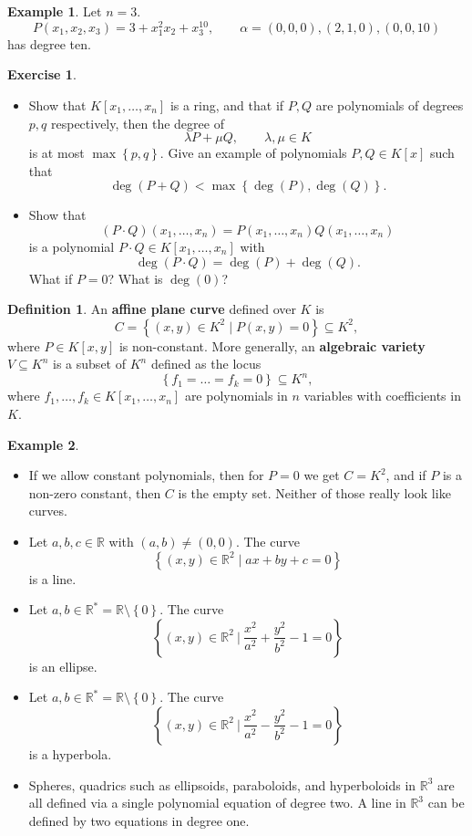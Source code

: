 \documentclass{article}
\newcommand{\R}{\mathbb{R}}
\newcommand{\rb}[1]{\left( #1 \right)}
\renewcommand{\sb}[1]{\left[ #1 \right]}
\newcommand{\cb}[1]{\left\{ #1 \right\}}
\theoremstyle{definition}\newtheorem{definition}{Definition}[section]
\theoremstyle{definition}\newtheorem{notation}[definition]{Notation}
\theoremstyle{definition}\newtheorem{remark}[definition]{Remark}
\theoremstyle{definition}\newtheorem{example1}[definition]{Example}
\theoremstyle{definition}\newtheorem{fact}{Fact}
\theoremstyle{definition}\newtheorem{exercise}{Exercise}
\theoremstyle{definition}\newtheorem*{example2}{Example}
\begin{document}
\begin{example2}
Let $ n = 3 $.
$$ P\rb{x_1, x_2, x_3} = 3 + x_1^2x_2 + x_3^{10}, \qquad \alpha = \rb{0, 0, 0}, \rb{2, 1, 0}, \rb{0, 0, 10} $$
has degree ten.
\end{example2}

\begin{exercise}
\hfill
\begin{itemize}
\item Show that $ K\sb{x_1, \dots, x_n} $ is a ring, and that if $ P, Q $ are polynomials of degrees $ p, q $ respectively, then the degree of
$$ \lambda P + \mu Q, \qquad \lambda, \mu \in K $$
is at most $ \max\cb{p, q} $. Give an example of polynomials $ P, Q \in K\sb{x} $ such that
$$ \deg\rb{P + Q} < \max\cb{\deg\rb{P}, \deg\rb{Q}}. $$
\item Show that
$$ \rb{P \cdot Q}\rb{x_1, \dots, x_n} = P\rb{x_1, \dots, x_n}Q\rb{x_1, \dots, x_n} $$
is a polynomial $ P \cdot Q \in K\sb{x_1, \dots, x_n} $ with
$$ \deg\rb{P \cdot Q} = \deg\rb{P} + \deg\rb{Q}. $$
What if $ P = 0 $? What is $ \deg\rb{0} $?
\end{itemize}
\end{exercise}

\begin{definition}
An \textbf{affine plane curve} defined over $ K $ is
$$ C = \cb{\rb{x, y} \in K^2 \mid P\rb{x, y} = 0} \subseteq K^2, $$
where $ P \in K\sb{x, y} $ is non-constant. More generally, an \textbf{algebraic variety} $ V \subseteq K^n $ is a subset of $ K^n $ defined as the locus
$$ \cb{f_1 = \dots = f_k = 0} \subseteq K^n, $$
where $ f_1, \dots, f_k \in K\sb{x_1, \dots, x_n} $ are polynomials in $ n $ variables with coefficients in $ K $.
\end{definition}

\begin{example1}
\hfill
\begin{itemize}
\item If we allow constant polynomials, then for $ P = 0 $ we get $ C = K^2 $, and if $ P $ is a non-zero constant, then $ C $ is the empty set. Neither of those really look like curves.
\item Let $ a, b, c \in \R $ with $ \rb{a, b} \ne \rb{0, 0} $. The curve
$$ \cb{\rb{x, y} \in \R^2 \mid ax + by + c = 0} $$
is a line.
\item Let $ a, b \in \R^* = \R \setminus \cb{0} $. The curve
$$ \cb{\rb{x, y} \in \R^2 \ \Bigg| \ \dfrac{x^2}{a^2} + \dfrac{y^2}{b^2} - 1 = 0} $$
is an ellipse.
\item Let $ a, b \in \R^* = \R \setminus \cb{0} $. The curve
$$ \cb{\rb{x, y} \in \R^2 \ \Bigg| \ \dfrac{x^2}{a^2} - \dfrac{y^2}{b^2} - 1 = 0} $$
is a hyperbola.
\item Spheres, quadrics such as ellipsoids, paraboloids, and hyperboloids in $ \R^3 $ are all defined via a single polynomial equation of degree two. A line in $ \R^3 $ can be defined by two equations in degree one.
\end{itemize}
\end{example1}
\end{document}
